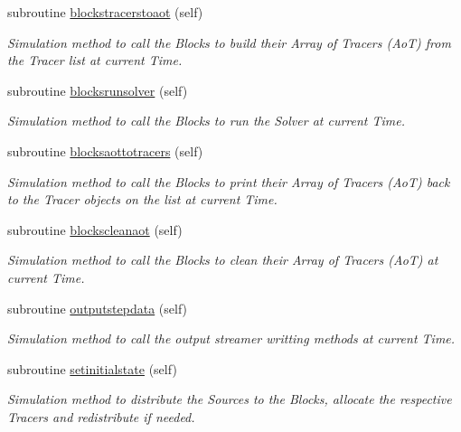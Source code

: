 \begin{DoxyCompactItemize}
subroutine \mbox{\hyperlink{namespacesimulation__mod_a624d5b402a8d359219839841862ab307}{blockstracerstoaot}} (self)
\begin{DoxyCompactList}\small\item\em Simulation method to call the Blocks to build their Array of Tracers (AoT) from the Tracer list at current Time. \end{DoxyCompactList}\item 
subroutine \mbox{\hyperlink{namespacesimulation__mod_ab2e7a1b0f131ab6fe40454d32cb3e24f}{blocksrunsolver}} (self)
\begin{DoxyCompactList}\small\item\em Simulation method to call the Blocks to run the Solver at current Time. \end{DoxyCompactList}\item 
subroutine \mbox{\hyperlink{namespacesimulation__mod_a03afd8682d3239c0ce8eb1637e4da806}{blocksaottotracers}} (self)
\begin{DoxyCompactList}\small\item\em Simulation method to call the Blocks to print their Array of Tracers (AoT) back to the Tracer objects on the list at current Time. \end{DoxyCompactList}\item 
subroutine \mbox{\hyperlink{namespacesimulation__mod_a9c7e093e5cf65d3414f9a8cf8beab611}{blockscleanaot}} (self)
\begin{DoxyCompactList}\small\item\em Simulation method to call the Blocks to clean their Array of Tracers (AoT) at current Time. \end{DoxyCompactList}\item 
subroutine \mbox{\hyperlink{namespacesimulation__mod_a5735e9ecb39f15061f3d766b0de7809d}{outputstepdata}} (self)
\begin{DoxyCompactList}\small\item\em Simulation method to call the output streamer writting methods at current Time. \end{DoxyCompactList}\item 
subroutine \mbox{\hyperlink{namespacesimulation__mod_a447c6d709de6aa360a65d39d660e627b}{setinitialstate}} (self)
\begin{DoxyCompactList}\small\item\em Simulation method to distribute the Sources to the Blocks, allocate the respective Tracers and redistribute if needed. \end{DoxyCompactList}\item 

\end{DoxyCompactItemize}
